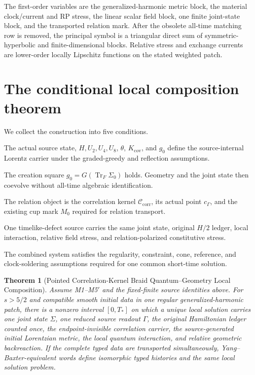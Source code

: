 \documentclass[11pt]{article}
\newtheorem{theorem}{Theorem}[section]
\theoremstyle{definition}
\theoremstyle{remark}
\newcommand{\cC}{\mathcal{C}}
\newcommand{\Tr}{\operatorname{Tr}}
\begin{document}
The first-order variables are the generalized-harmonic metric block, the material clock/current and RP stress, the linear scalar field block, one finite joint-state block, and the transported relation mark. After the obsolete all-time matching row is removed, the principal symbol is a triangular direct sum of symmetric-hyperbolic and finite-dimensional blocks. Relative stress and exchange currents are lower-order locally Lipschitz functions on the stated weighted patch.

\section{The conditional local composition theorem}

We collect the construction into five conditions.

\begin{description}[leftmargin=3.2em,style=nextline]
\item[M1] The actual source state, $H,U_2,U_4,U_8$, $\theta$, $K_{\mathrm{cov}}$, and $g_0$ define the source-internal Lorentz carrier under the graded-greedy and reflection assumptions.
\item[M2$'$] The creation square $g_0=G(\Tr_F\Sigma_0)$ holds. Geometry and the joint state then coevolve without all-time algebraic identification.
\item[M3$^*$] The relation object is the correlation kernel $\cC_{\mathrm{corr}}$, its actual point $c_\Gamma$, and the existing cup mark $M_0$ required for relation transport.
\item[M4$'$] One timelike-defect source carries the same joint state, original $H/2$ ledger, local interaction, relative field stress, and relation-polarized constitutive stress.
\item[M5$'$] The combined system satisfies the regularity, constraint, cone, reference, and clock-soldering assumptions required for one common short-time solution.
\end{description}

\begin{theorem}[Pointed Correlation-Kernel Braid Quantum--Geometry Local Composition]\label{thm:main}
Assume M1--M5$'$ and the fixed-finite source identities above. For $s>5/2$ and compatible smooth initial data in one regular generalized-harmonic patch, there is a nonzero interval $[0,T_*]$ on which a unique local solution carries one joint state $\Sigma$, one reduced source readout $\Gamma$, the original Hamiltonian ledger counted once, the endpoint-invisible correlation carrier, the source-generated initial Lorentzian metric, the local quantum interaction, and relative geometric backreaction. If the complete typed data are transported simultaneously, Yang--Baxter-equivalent words define isomorphic typed histories and the same local solution problem.
\end{theorem}
\end{document}
